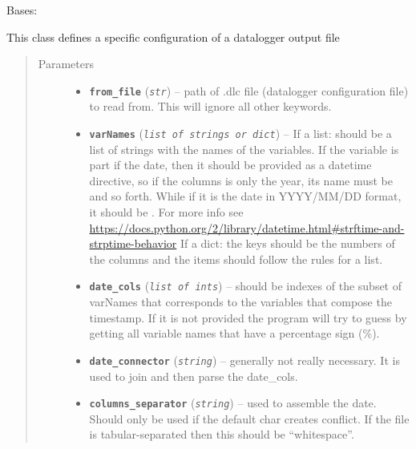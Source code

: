 \documentclass[a4paper,10pt,oneside]{sphinxmanual}
\begin{document}

\begin{fulllineitems}
\label{pymicra:pymicra.core.dataloggerConfig}
Bases: 

This class defines a specific configuration of a datalogger output file
\begin{quote}\begin{description}
\item[{Parameters}] \leavevmode\begin{itemize}
\item {} 
\textbf{\texttt{from\_file}} (\emph{\texttt{str}}) -- path of .dlc file (datalogger configuration file) to read from. This will ignore all other
keywords.

\item {} 
\textbf{\texttt{varNames}} (\emph{\texttt{list of strings or dict}}) -- If a list: should be a list of strings with the names of the variables. If the variable
is part if the date, then it should be provided as a datetime directive,
so if the columns is only the year, its name must be  and so forth. While
if it is the date in YYYY/MM/DD format, it should be . For more info
see \url{https://docs.python.org/2/library/datetime.html\#strftime-and-strptime-behavior}
If a dict: the keys should be the numbers of the columns and the items should follow
the rules for a list.

\item {} 
\textbf{\texttt{date\_cols}} (\emph{\texttt{list of ints}}) -- should be indexes of the subset of varNames that corresponds to the variables that compose
the timestamp. If it is not provided the program will try to guess by getting
all variable names that have a percentage sign (\%).

\item {} 
\textbf{\texttt{date\_connector}} (\emph{\texttt{string}}) -- generally not really necessary. It is used to join and then parse the date\_cols.

\item {} 
\textbf{\texttt{columns\_separator}} (\emph{\texttt{string}}) -- used to assemble the date. Should only be used if the default char creates conflict. If
the file is tabular-separated then this should be ``whitespace''.


\end{itemize}
\end{description}
\end{quote}
\end{fulllineitems}
\end{document}
